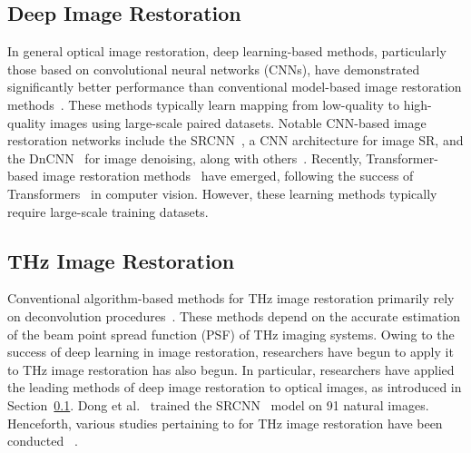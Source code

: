 \subsection{Deep Image Restoration}
\label{sec:dir}
In general optical image restoration, deep learning-based methods, particularly those based on convolutional neural networks (CNNs), have demonstrated significantly better performance than conventional model-based image restoration methods~\cite{gu2012fast, timofte2013anchored, timofte2015a+, michaeli2013nonparametric, he2010single}. These methods typically learn mapping from low-quality to high-quality images using large-scale paired datasets. Notable CNN-based image restoration networks include the SRCNN~\cite{dongSRCNN2014}, a CNN architecture for image SR, and the DnCNN~\cite{zhangDnCNN2017} for image denoising, along with others~\cite{kim2016accurate, wang2018esrgan, zhang2021plug, zhang2020residual, peng2019dilated, chen2022simple, fu2021model}. Recently, Transformer-based image restoration methods~\cite{liangSwinIRImageRestoration2021, wangUformerGeneralUShaped2022, chenActivatingMorePixels2023} have emerged, following the success of Transformers~\cite{vaswani2017attention} in computer vision. However, these learning methods typically require large-scale training datasets.


\subsection{THz Image Restoration}
Conventional algorithm-based methods for THz image restoration primarily rely on deconvolution procedures~\cite{li2010continuous, ding2010high, xu2014high, wongComputationalImageEnhancement2018, ningResolutionEnhancementTerahertz2019}. These methods depend on the accurate estimation of the beam point spread function (PSF) of THz imaging systems. Owing to the success of deep learning in image restoration, researchers have begun to apply it to THz image restoration has also begun. In particular, researchers have applied the leading methods of deep image restoration to optical images, as introduced in Section~\ref{sec:dir}. Dong et al.~\cite{liTerahertzImageSuperresolution2017a} trained the SRCNN~\cite{dongSRCNN2014} model on 91 natural images. Henceforth, various studies pertaining to for THz image restoration have been conducted ~\cite{leiTerahertzTimedomainSuperresolution2021,wongTrainingAutoencoderbasedOptimizers2019,marinaljubenovicJointDeblurringDenoising2020,hanTerahertzImageRestoration2020,wangTerahertzImageSuperresolution2021,longTerahertzImageSuperresolution2019,zhangRestorationIntegratedCircuit2021,zhangTerahertzImageRestoration2022,luMathematicalDegradationModel2021a,ruanEfficientSubpixelConvolutional2022,maoImageFusionBased2020,suDataDrivenBasedTerahertzImage2023,liAdaptiveTerahertzImage2020,wangComplexZeroshotSuperresolution2022,ljubenovicCNNbasedDeblurringTerahertz2020,yangSuperresolutionReconstructionTerahertz2022,ljubenovicBeamShapeEffectsNoise2022}. 

